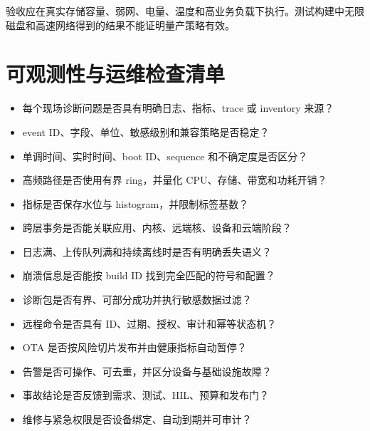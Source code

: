 验收应在真实存储容量、弱网、电量、温度和高业务负载下执行。测试构建中无限磁盘和高速网络得到的结果不能证明量产策略有效。

\section{可观测性与运维检查清单}

\begin{itemize}
  \item 每个现场诊断问题是否具有明确日志、指标、trace 或 inventory 来源？
  \item event ID、字段、单位、敏感级别和兼容策略是否稳定？
  \item 单调时间、实时时间、boot ID、sequence 和不确定度是否区分？
  \item 高频路径是否使用有界 ring，并量化 CPU、存储、带宽和功耗开销？
  \item 指标是否保存水位与 histogram，并限制标签基数？
  \item 跨层事务是否能关联应用、内核、远端核、设备和云端阶段？
  \item 日志满、上传队列满和持续离线时是否有明确丢失语义？
  \item 崩溃信息是否能按 build ID 找到完全匹配的符号和配置？
  \item 诊断包是否有界、可部分成功并执行敏感数据过滤？
  \item 远程命令是否具有 ID、过期、授权、审计和幂等状态机？
  \item OTA 是否按风险切片发布并由健康指标自动暂停？
  \item 告警是否可操作、可去重，并区分设备与基础设施故障？
  \item 事故结论是否反馈到需求、测试、HIL、预算和发布门？
  \item 维修与紧急权限是否设备绑定、自动到期并可审计？
\end{itemize}
